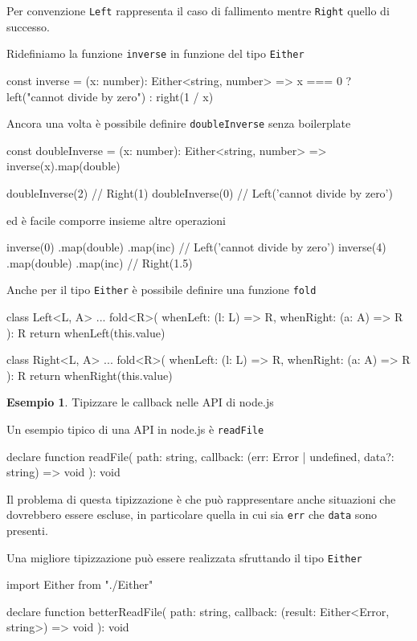 \documentclass[12pt]{article}
\theoremstyle{definition}
\newtheorem{example}{Esempio}[subsection]
\newenvironment{code}
  {\vspace{0.5cm} \VerbatimEnvironment\begin{typescriptcode}}
  {\end{typescriptcode} \vspace{0.2cm}}
\begin{document}
Per convenzione \texttt{Left} rappresenta il caso di fallimento mentre \texttt{Right} quello di successo.

Ridefiniamo la funzione \texttt{inverse} in funzione del tipo \texttt{Either}

\begin{code}
const inverse = (x: number): Either<string, number> =>
  x === 0 ? left("cannot divide by zero") : right(1 / x)
\end{code}

Ancora una volta è possibile definire \texttt{doubleInverse} senza boilerplate

\begin{code}
const doubleInverse = (x: number): Either<string, number> =>
  inverse(x).map(double)

doubleInverse(2) // Right(1)
doubleInverse(0) // Left('cannot divide by zero')
\end{code}

ed è facile comporre insieme altre operazioni

\begin{code}
inverse(0)
  .map(double)
  .map(inc) // Left('cannot divide by zero')
inverse(4)
  .map(double)
  .map(inc) // Right(1.5)
\end{code}

Anche per il tipo \texttt{Either} è possibile definire una funzione \texttt{fold}

\begin{code}
class Left<L, A> {
  ...
  fold<R>(
    whenLeft: (l: L) => R,
    whenRight: (a: A) => R
  ): R {
    return whenLeft(this.value)
  }
}

class Right<L, A> {
  ...
  fold<R>(
    whenLeft: (l: L) => R,
    whenRight: (a: A) => R
  ): R {
    return whenRight(this.value)
  }
}
\end{code}

\begin{example}
Tipizzare le callback nelle API di node.js

Un esempio tipico di una API in node.js è \texttt{readFile}

\begin{code}
declare function readFile(
  path: string,
  callback: (err: Error | undefined, data?: string) => void
): void
\end{code}

Il problema di questa tipizzazione è che può rappresentare anche situazioni che dovrebbero essere escluse, in particolare
quella in cui sia \texttt{err} che \texttt{data} sono presenti.

Una migliore tipizzazione può essere realizzata sfruttando il tipo \texttt{Either}

\begin{code}
import { Either } from "./Either"

declare function betterReadFile(
  path: string,
  callback: (result: Either<Error, string>) => void
): void
\end{code}
\end{example}
\end{document}
